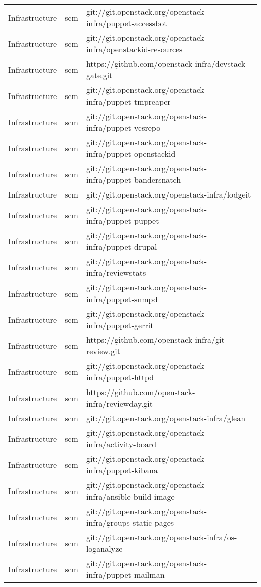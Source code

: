 \begin{center}
\begin{longtable}{|p{4cm}|p{1cm}|p{10cm}|}
Infrastructure&scm&git://git.openstack.org/openstack-infra/puppet-accessbot\\ 
Infrastructure&scm&git://git.openstack.org/openstack-infra/openstackid-resources\\ 
Infrastructure&scm&https://github.com/openstack-infra/devstack-gate.git\\ 
Infrastructure&scm&git://git.openstack.org/openstack-infra/puppet-tmpreaper\\ 
Infrastructure&scm&git://git.openstack.org/openstack-infra/puppet-vcsrepo\\ 
Infrastructure&scm&git://git.openstack.org/openstack-infra/puppet-openstackid\\ 
Infrastructure&scm&git://git.openstack.org/openstack-infra/puppet-bandersnatch\\ 
Infrastructure&scm&git://git.openstack.org/openstack-infra/lodgeit\\ 
Infrastructure&scm&git://git.openstack.org/openstack-infra/puppet-puppet\\ 
Infrastructure&scm&git://git.openstack.org/openstack-infra/puppet-drupal\\ 
Infrastructure&scm&git://git.openstack.org/openstack-infra/reviewstats\\ 
Infrastructure&scm&git://git.openstack.org/openstack-infra/puppet-snmpd\\ 
Infrastructure&scm&git://git.openstack.org/openstack-infra/puppet-gerrit\\ 
Infrastructure&scm&https://github.com/openstack-infra/git-review.git\\ 
Infrastructure&scm&git://git.openstack.org/openstack-infra/puppet-httpd\\ 
Infrastructure&scm&https://github.com/openstack-infra/reviewday.git\\ 
Infrastructure&scm&git://git.openstack.org/openstack-infra/glean\\ 
Infrastructure&scm&git://git.openstack.org/openstack-infra/activity-board\\ 
Infrastructure&scm&git://git.openstack.org/openstack-infra/puppet-kibana\\ 
Infrastructure&scm&git://git.openstack.org/openstack-infra/ansible-build-image\\ 
Infrastructure&scm&git://git.openstack.org/openstack-infra/groups-static-pages\\ 
Infrastructure&scm&git://git.openstack.org/openstack-infra/os-loganalyze\\ 
Infrastructure&scm&git://git.openstack.org/openstack-infra/puppet-mailman\\ 

\end{longtable}
\end{center}
